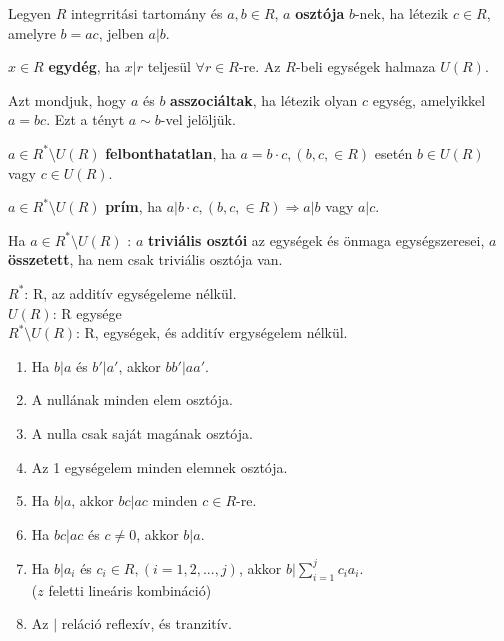 \begin{frame}
  \begin{tcolorbox}[title={Oszthatóság egységelemes integritási tarományban (Emlékeztető)}]
    Legyen $R$ integrritási tartomány és $a, b \in R$, $a$ \textbf{osztója} $b$-nek, ha létezik $c \in R$, amelyre $b = ac$, jelben $a | b$.\\
    \mmedskip

    $x \in R$ \textbf{egydég}, ha $x | r$ teljesül ${\forall}r \in R$-re. Az $R$-beli egységek halmaza $U(R)$.\\
    \mmedskip

    Azt mondjuk, hogy $a$ és $b$ \textbf{asszociáltak}, ha létezik olyan $c$ egység, amelyikkel $a = bc$. Ezt a tényt $a \sim b$-vel jelöljük.\\
    \mmedskip

    $a \in R^*{\setminus}U(R)$ \textbf{felbonthatatlan}, ha $a = b \cdot c, (b, c, \in R)$ esetén $b \in U(R)$ vagy $c \in U(R)$.\\
    \mmedskip

    $a \in R^*{\setminus}U(R)$ \textbf{prím}, ha $a | b \cdot c, (b, c, \in R) \Rightarrow a | b$ vagy $a | c$.\\
    \mmedskip

    Ha $a \in R^*{\setminus}U(R)$ : $a$ \textbf{triviális osztói} az egységek és önmaga egységszeresei, $a$ \textbf{összetett}, ha nem csak triviális osztója van.\\
    \mmedskip

    $R^*$: R, az additív egységeleme nélkül.\\
    $U(R)$: R egysége\\
    $R^*{\setminus}U(R)$: R, egységek, és additív ergységelem nélkül.
  \end{tcolorbox}
\end{frame}

\begin{frame}
\begin{tcolorbox}[title={Tétel: Az oszthatóság tulajdonságai EIT-ban}]
\begin{enumerate}
\item Ha $b|a$ és $b'|a'$, akkor $bb'|aa'$.
\item A nullának minden elem osztója.
\item A nulla csak saját magának osztója.
\item Az 1 egységelem minden elemnek osztója.
\item Ha $b|a$, akkor $bc|ac$ minden $c \in R$-re.
\item Ha $bc|ac$ és $c \neq 0$, akkor $b|a$.
\item Ha $b|a_i$ és $c_i \in R, (i = 1, 2, ..., j)$, akkor $b|\sum^j_{i=1} c_ia_i$.\\
($z$ feletti lineáris kombináció)
\item Az $|$ reláció reflexív, és tranzitív.
\end{enumerate}
\end{tcolorbox}
\end{frame}

